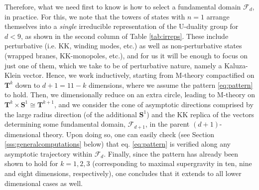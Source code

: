 Therefore, what we need first to know is how to select a fundamental domain $\mathscr{F}_d$, in practice. For this, we note that the towers of states with $n=1$ arrange themselves into a \emph{single} irreducible representation of the U-duality group for $d<9$, as shown in the second column of Table \ref{tab:irreps}. These include perturbative (i.e. KK, winding modes, etc.) as well as non-perturbative states (wrapped branes, KK-monopoles, etc.), and for us it will be enough to focus on just one of them, which we take to be of perturbative nature, namely a Kaluza-Klein vector. Hence, we work inductively, starting from M-theory compactified on $\mathbf{T}^k$ down to $d+1=11-k$ dimensions, where we assume the pattern \eqref{eq:pattern} to hold. Then, we dimensionally reduce on an extra circle, leading to M-theory on $\mathbf{T}^k \times \mathbf{S}^1 \cong \mathbf{T}^{k+1}$, and we consider the cone of asymptotic directions comprised by the large radius direction (of the additional $\mathbf{S}^1$) and the KK replica of the vectors determining some fundamental domain, $\mathscr{F}_{d+1}$, in the parent $(d+1)$-dimensional theory. %
Upon doing so, one can easily check (see Section \ref{sss:generalcomputations} below) that eq. \eqref{eq:pattern} is verified along any asymptotic trajectory within $\mathscr{F}_d$. Finally, since the pattern has already been shown to hold for $k=1,2,3$ (corresponding to maximal supergravity in ten, nine and eight dimensions, respectively), one concludes that it extends to all lower dimensional cases as well.
	
